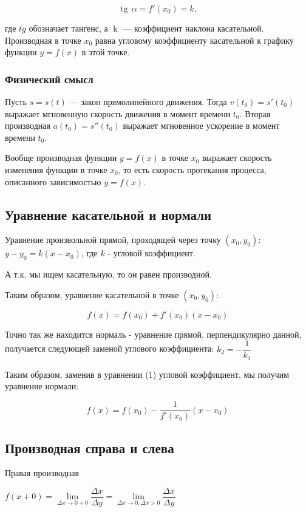 $$\operatorname{tg}\,\alpha = f'(x_0)= k,$$


где ${tg}$ обозначает тангенс, а $\operatorname {k} $ — коэффициент наклона касательной.
Производная в точке $x_0$ равна угловому коэффициенту касательной к графику функции $y = f(x)$ в этой точке.

\subsubsection{Физический смысл}

Пусть $s=s(t)$ — закон прямолинейного движения. Тогда $v(t_0)=s'(t_0)$ выражает мгновенную скорость движения в момент времени $t_0.$ Вторая производная $a(t_0) = s''(t_0)$ выражает мгновенное ускорение в момент времени $t_0.$

Вообще производная функции $y=f(x)$ в точке $x_0$ выражает скорость изменения функции в точке $x_0$, то есть скорость протекания процесса, описанного зависимостью $y=f(x).$

\subsection{Уравнение касательной и нормали}

Уравнение произвольной прямой, проходящей через точку $ (x_{0}, y_{0}) $:
$ y - y_{0} = k(x - x_{0}) $, где $ k $ - угловой коэффициент.

А т.к. мы ищем касательную, то он равен производной.

Таким образом, уравнение касательной в точке $ (x_{0}, y_{0}) $:

$$
f(x) = f(x_0) + f'(x_0)(x-x_0)
$$

Точно так же находится нормаль - уравнение прямой, перпендикулярно данной, получается следующей заменой углового коэффициента: $ k_{2} = -\dfrac{1}{k_{1}} $

Таким образом, заменив в уравнении (1) угловой коэффициент, мы получим уравнение нормали:

$$
f(x) = f(x_0) - \dfrac{1}{f'(x_0)} (x-x_0)
$$


\subsection{Производная справа и слева}

Правая производная

$ f(x+0) = \lim\limits_{\Delta x \to 0+0} \dfrac{\Delta x}{\Delta y}
 = \lim\limits_{\Delta x \to 0, \Delta x > 0} \dfrac{\Delta x}{\Delta y} $


